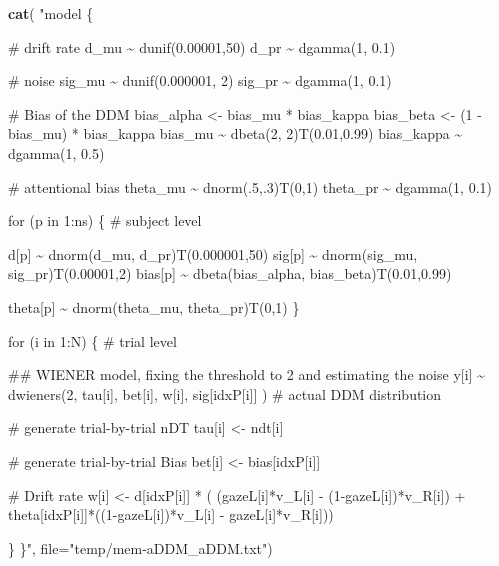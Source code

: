 \documentclass[
]{book}
\newenvironment{Shaded}{\begin{snugshade}}{\end{snugshade}}
\newcommand{\AttributeTok}[1]{\textcolor[rgb]{0.13,0.29,0.53}{#1}}
\newcommand{\FunctionTok}[1]{\textcolor[rgb]{0.13,0.29,0.53}{\textbf{#1}}}
\newcommand{\NormalTok}[1]{#1}
\newcommand{\StringTok}[1]{\textcolor[rgb]{0.31,0.60,0.02}{#1}}
\begin{document}
\begin{Shaded}
\begin{Highlighting}[]
\FunctionTok{cat}\NormalTok{( }\StringTok{"model \{}

\StringTok{    \# drift rate}
\StringTok{        d\_mu \textasciitilde{} dunif(0.00001,50)}
\StringTok{        d\_pr \textasciitilde{} dgamma(1, 0.1)}

\StringTok{    \# noise}
\StringTok{        sig\_mu \textasciitilde{} dunif(0.000001, 2)}
\StringTok{        sig\_pr \textasciitilde{} dgamma(1, 0.1)}

\StringTok{    \# Bias of the DDM}
\StringTok{        bias\_alpha \textless{}{-} bias\_mu * bias\_kappa}
\StringTok{        bias\_beta \textless{}{-} (1 {-} bias\_mu) * bias\_kappa}
\StringTok{        bias\_mu \textasciitilde{} dbeta(2, 2)T(0.01,0.99)}
\StringTok{        bias\_kappa \textasciitilde{} dgamma(1, 0.5)}

\StringTok{    \# attentional bias}
\StringTok{        theta\_mu \textasciitilde{} dnorm(.5,.3)T(0,1)}
\StringTok{        theta\_pr \textasciitilde{} dgamma(1, 0.1)}

\StringTok{    for (p in 1:ns) \{ \# subject level}

\StringTok{        d[p] \textasciitilde{} dnorm(d\_mu, d\_pr)T(0.000001,50)}
\StringTok{        }
\StringTok{        sig[p] \textasciitilde{} dnorm(sig\_mu, sig\_pr)T(0.00001,2)}
\StringTok{        }
\StringTok{        bias[p] \textasciitilde{} dbeta(bias\_alpha, bias\_beta)T(0.01,0.99)}

\StringTok{        theta[p] \textasciitilde{} dnorm(theta\_mu, theta\_pr)T(0,1)}
\StringTok{    \}}

\StringTok{    for (i in 1:N) \{ \# trial level}

\StringTok{    \#\# WIENER model, fixing the threshold to 2 and estimating the noise}
\StringTok{        y[i] \textasciitilde{} dwieners(2, tau[i], bet[i], w[i], sig[idxP[i]] ) \# actual DDM distribution}

\StringTok{        \# generate trial{-}by{-}trial nDT}
\StringTok{        tau[i] \textless{}{-} ndt[i]}

\StringTok{        \# generate trial{-}by{-}trial Bias}
\StringTok{        bet[i] \textless{}{-} bias[idxP[i]]}

\StringTok{        \# Drift rate}
\StringTok{        w[i] \textless{}{-} d[idxP[i]] * ( (gazeL[i]*v\_L[i] {-} (1{-}gazeL[i])*v\_R[i]) + theta[idxP[i]]*((1{-}gazeL[i])*v\_L[i] {-} gazeL[i]*v\_R[i]))}

\StringTok{    \}}
\StringTok{\}"}\NormalTok{, }\AttributeTok{file=}\StringTok{"temp/mem{-}aDDM\_aDDM.txt"}\NormalTok{)}
\end{Highlighting}
\end{Shaded}
\end{document}
